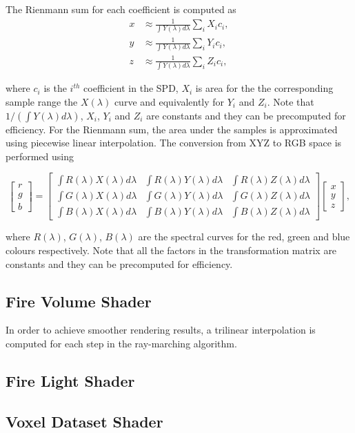 The Rienmann sum for each coefficient is computed as
\begin{equation}
\begin{split}
x &\approx \frac{1}{\int Y(\lambda) d\lambda} \sum_i X_i c_i, \\
y &\approx \frac{1}{\int Y(\lambda) d\lambda} \sum_i Y_i c_i, \\
z &\approx \frac{1}{\int Y(\lambda) d\lambda} \sum_i Z_i c_i,
\end{split}
\end{equation}

where $c_i$ is the $i^{th}$ coefficient in the SPD, $X_i$ is area for the the corresponding sample range the $X(\lambda)$ curve and equivalently for $Y_i$ and $Z_i$.
Note that $1 / \left(\int Y(\lambda) d\lambda \right)$, $X_i$, $Y_i$ and $Z_i$ are constants and they can be precomputed for efficiency.
For the Rienmann sum, the area under the samples is approximated using piecewise linear interpolation.
The conversion from XYZ to RGB space is performed using

\begin{equation}
\begin{bmatrix}
r \\
g \\
b
\end{bmatrix}
 = 
\begin{bmatrix}
\int R(\lambda) X(\lambda) d\lambda & \int R(\lambda) Y(\lambda) d\lambda & \int R(\lambda) Z(\lambda) d\lambda \\
\int G(\lambda) X(\lambda) d\lambda & \int G(\lambda) Y(\lambda) d\lambda & \int G(\lambda) Z(\lambda) d\lambda \\
\int B(\lambda) X(\lambda) d\lambda & \int B(\lambda) Y(\lambda) d\lambda & \int B(\lambda) Z(\lambda) d\lambda
\end{bmatrix}
\begin{bmatrix}
x \\
y \\
z
\end{bmatrix},
\end{equation}

where $R(\lambda)$, $G(\lambda)$, $B(\lambda)$ are the spectral curves for the red, green and blue colours respectively.
Note that all the factors in the transformation matrix are constants and they can be precomputed for efficiency.

\subsection{Fire Volume Shader}
\label{sec:fire_volume_shader}

In order to achieve smoother rendering results, a trilinear interpolation is computed for each step in the ray-marching algorithm. 


\subsection{Fire Light Shader}
\label{sec:fire_light_shader}


\subsection{Voxel Dataset Shader}
\label{sec:voxel_dataset_shader}
